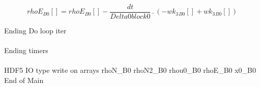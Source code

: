 \documentclass{article}
\begin{document}
\begin{dmath}{rhoE{_{B0}}}[{}] = {rhoE{_{B0}}}[{}] - \frac{dt}{Delta0block0} \,.\, \left(- {wk_{3}{_{B0}}}[{}] + {wk_{3}{_{B0}}}[{}]\right)\end{dmath}

\noindent Ending Do loop iter\\
\\\noindent Ending timers\\
\\\noindent HDF5 IO type write on arrays rhoN_B0 rhoN2_B0 rhou0_B0 rhoE_B0 x0_B0\\\noindent End of Main\\
\end{document}
